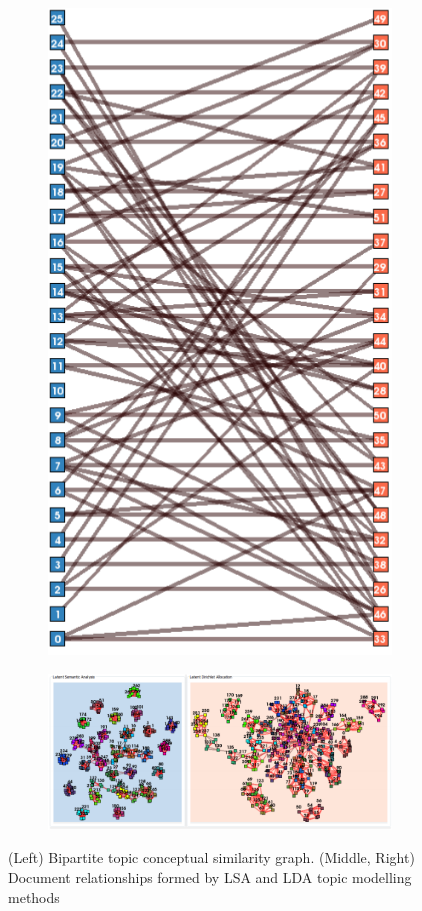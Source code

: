 \documentclass[10pt]{report}
\begin{document}
\begin{figure}[h!]
  \begin{subfigure}{.33\textwidth}
    \includegraphics[scale=0.20]{lda_lsa_topic_view}
\end{subfigure}
\begin{subfigure}{.33\textwidth}
  \includegraphics[scale=0.35]{lda_lsa_document_view}
\end{subfigure}
\caption{(Left) Bipartite topic conceptual similarity graph. (Middle, Right) Document relationships formed by LSA and LDA topic modelling methods \label{fig:topic_modelling_comparisons}}
\end{figure}
\end{document}
